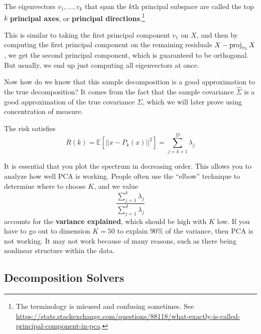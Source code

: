   \begin{definition}
    The eigenvectors $v_1, \ldots, v_k$ that span the $k$th principal subspace are called the top $k$ \textbf{principal axes}, or \textbf{principal directions}.\footnote{The terminology is misused and confusing sometimes. See \href{https://stats.stackexchange.com/questions/88118/what-exactly-is-called-principal-component-in-pca}{https://stats.stackexchange.com/questions/88118/what-exactly-is-called-principal-component-in-pca}.} 
  \end{definition}

  This is similar to taking the first principal component $v_1$ on $X$, and then by computing the first principal component on the remaining residuals $X - \operatorname{proj}_{v_1} X$, we get the second principal component, which is guaranteed to be orthogonal. But usually, we end up just computing all eigenvectors at once. 

  Now how do we know that this sample decomposition is a good approximation to the true decomposition? It comes from the fact that the sample covariance $\hat{\Sigma}$ is a good approximation of the true covariance $\Sigma$, which we will later prove using concentration of measure. 

  \begin{theorem}[Risk]
    The risk satisfies 
    \begin{equation}
      R(k) = \mathbb{E}[|| x - P_k (x) ||^2 ] = \sum_{j=k+1}^D \lambda_j 
    \end{equation}
  \end{theorem}

  It is essential that you plot the spectrum in decreasing order. This allows you to analyze how well PCA is working. People often use the ``elbow'' technique to determine where to choose $K$, and we value 
  \begin{equation}
    \frac{\sum_{j=1}^k \lambda_j}{\sum_{j=1}^d \lambda_j} 
  \end{equation}
  accounts for the \textbf{variance explained}, which should be high with $K$ low. If you have to go out to dimension $K=50$ to explain $90\%$ of the variance, then PCA is not working. It may not work because of many reasons, such as there being nonlinear structure within the data. 

\subsection{Decomposition Solvers}


